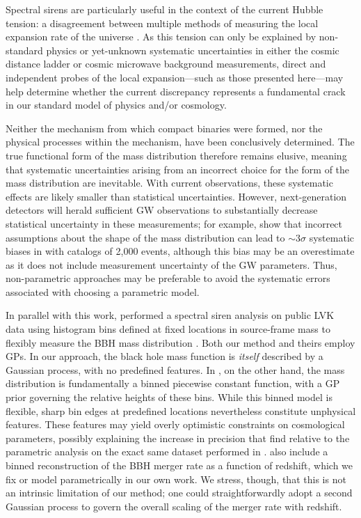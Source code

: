 \documentclass[preprint2,linenumbers]{aastex631}
\begin{document}
Spectral sirens are particularly useful in the context of the current Hubble tension: a disagreement between multiple methods of measuring the local expansion rate of the universe \citep{freedman_measurements_2021}.
As this tension can only be explained by non-standard physics or yet-unknown systematic uncertainties in either the cosmic distance ladder or cosmic microwave background measurements, direct and independent probes of the local expansion---such as those presented here---may help determine whether the current discrepancy represents a fundamental crack in our standard model of physics and/or cosmology.
    
Neither the mechanism from which compact binaries were formed, nor the physical processes within the mechanism, have been conclusively determined.
The true functional form of the mass distribution therefore remains elusive, meaning that systematic uncertainties arising from an incorrect choice for the form of the mass distribution are inevitable.
With current observations, these systematic effects are likely smaller than statistical uncertainties.
However, next-generation detectors will herald sufficient \ac{GW} observations to substantially decrease statistical uncertainty in these measurements; for example, \citet{pierra_study_2023} show that incorrect assumptions about the shape of the mass distribution can lead to $\sim3\sigma$ systematic biases in \Ho{} with catalogs of 2,000 events, although this bias may be an overestimate as it does not include measurement uncertainty of the \ac{GW} parameters.
Thus, non-parametric approaches may be preferable to avoid the systematic errors associated with choosing a parametric model.

In parallel with this work, \citet{magana_hernandez_beyond_2024} performed a spectral siren analysis on public \ac{LVK} data using histogram bins defined at fixed locations in source-frame mass to flexibly measure the \ac{BBH} mass distribution \citep[as originally presented in][]{mandel_model-independent_2017,ray_non-parametric_2023}.
Both our method and theirs employ \acp{GP}.
In our approach, the black hole mass function is \textit{itself} described by a Gaussian process, with no predefined features.
In \citet{magana_hernandez_beyond_2024}, on the other hand, the mass distribution is fundamentally a binned piecewise constant function, with a \ac{GP} prior governing the relative heights of these bins.
While this binned model is flexible, sharp bin edges at predefined locations nevertheless constitute unphysical features.
These features may yield overly optimistic constraints on cosmological parameters, possibly explaining the increase in precision that \citet{magana_hernandez_beyond_2024} find relative to the parametric analysis on the exact same dataset performed in \citet{gwtc3_cosmo}.
\citet{magana_hernandez_beyond_2024} also include a binned reconstruction of the \ac{BBH} merger rate as a function of redshift, which we fix or model parametrically in our own work.
We stress, though, that this is not an intrinsic limitation of our method; one could straightforwardly adopt a second Gaussian process to govern the overall scaling of the merger rate with redshift.
\end{document}

